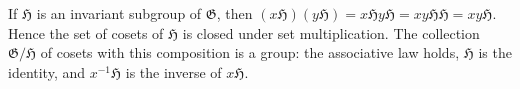 If $\mathfrak{H}$ is an invariant subgroup of $\mathfrak{G}$, then $(x\mathfrak{H})(y\mathfrak{H}) = x\mathfrak{H}y\mathfrak{H} = xy\mathfrak{H}\mathfrak{H} = xy\mathfrak{H}$. Hence the set of cosets of $\mathfrak{H}$ is closed under set multiplication. The collection $\mathfrak{G}/\mathfrak{H}$ of cosets with this composition is a group: the associative law holds, $\mathfrak{H}$ is the identity, and $x^{-1}\mathfrak{H}$ is the inverse of $x\mathfrak{H}$.
